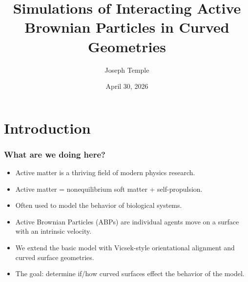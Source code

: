 \documentclass{beamer}
\title[CurvedABP]{Simulations of Interacting Active Brownian Particles in Curved Geometries}
\author{Joseph Temple}
\institute[Arkansas Tech University]{\normalsize ATU Mathematics Senior Seminar \\ \tiny Advisor: Matthew Hankins}
\date{\small April 30, 2026}
\begin{document}
\frame{\titlepage}


\section{Introduction}
\begin{frame}
    \frametitle{What are we doing here?}
    
    \begin{itemize}
        \item Active matter is a thriving field of modern physics research.
        \item Active matter = nonequilibrium soft matter + self-propulsion.
        \item Often used to model the behavior of biological systems.
        \item Active Brownian Particles (ABPs) are individual agents move on a surface with
        an intrinsic velocity.
        \item We extend the basic model with Vicsek-style orientational alignment and
        curved surface geometries.
        \item The goal: determine if/how curved surfaces effect the behavior of
        the model.
    \end{itemize}
    
\end{frame}
\end{document}
